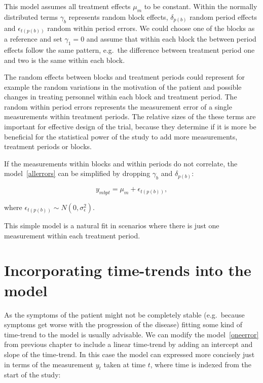 \documentclass[12pt,a4paper,leqno]{report}
\theoremstyle{plain}
\theoremstyle{definition}
\theoremstyle{remark}
\begin{document}
This model assumes all treatment effects \(\mu_m\) to be constant. Within the normally
distributed terms \(\gamma_b\) represents random block effects, \(\delta_{p(b)}\) random
period effects and \(\epsilon_{t(p(b))}\) random within period errors. We could choose
one of the blocks as a reference and set \(\gamma_1 = 0\) and assume that within each
block the between period effects follow the same pattern, e.g.\ the difference between
treatment period one and two is the same within each block.

The random effects between blocks and treatment periods could represent for example the
random variations in the motivation of the patient and possible changes in treating
personnel within each block and treatment period. The random within period errors
represents the measurement error of a single measurements within treatment periods. The
relative sizes of the these terms are important for effective design of the trial,
because they determine if it is more be beneficial for the statistical power of the study
to add more measurements, treatment periods or blocks.

If the measurements within blocks and within periods do not correlate, the model\
\ref{allerrors} can be simplified by dropping \(\gamma_b\) and \(\delta_{p(b)}\):

\begin{def}\label{}
    \begin{equation}\label{oneerror}
        y_{mbpt} = \mu_m + \epsilon_{t(p(b))},
    \end{equation}
\end{def}where \(\epsilon_{t(p(b))} \sim N(0,\sigma^2_{\epsilon})\).

This simple model is a natural fit in scenarios where there is just one measurement
within each treatment period.

\section{Incorporating time-trends into the model}\label{timetrends}

As the symptoms of the patient might not be completely stable (e.g.\ because symptoms get
worse with the progression of the disease) fitting some kind of time-trend to the model
is usually advisable. We can modify the model\ \ref{oneerror} from previous chapter to
include a linear time-trend by adding an intercept and slope of the time-trend. In this
case the model can expressed more concisely just in terms of the measurement \(y_t\)
taken at time \(t\), where time is indexed from the start of the study:
\end{document}
